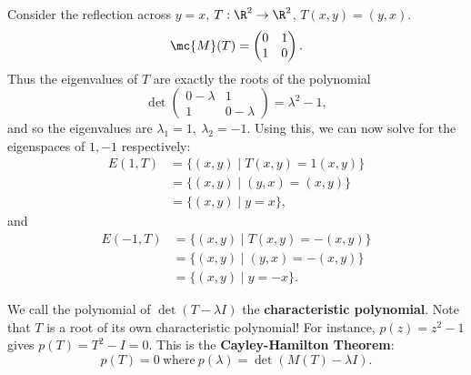 \documentclass[math0540-lecture-notes.tex]{subfiles}
\begin{document}
\begin{example}
  Consider the reflection across $y=x$, $T:\R^2\to \R^2$, $T(x,y)=(y,x)$. \[
    \mc{M}(T)=\begin{pmatrix} 0&1\\1&0 \end{pmatrix} 
  .\] Thus the eigenvalues of $T$ are exactly the roots of the polynomial \[
  \det{\begin{pmatrix} 0-\lambda&1\\1&0-\lambda \end{pmatrix} }=\lambda^2-1
  ,\] and so the eigenvalues are $\lambda_1=1,\ \lambda_2=-1$. Using this, we can now solve for the
  eigenspaces of $1,-1$ respectively:
  \begin{align*}
    E(1,T)&=\{(x,y)\mid T(x,y)=1(x,y)\} \\
          &=\{(x,y)\mid (y,x)=(x,y)\} \\
          &= \{(x,y)\mid y=x\} 
  ,\end{align*} and
  \begin{align*}
    E(-1,T)&=\{(x,y)\mid T(x,y)=-(x,y)\} \\
           &=\{(x,y)\mid (y,x)=-(x,y)\} \\
           &= \{(x,y)\mid y=-x\} 
  .\end{align*}
\end{example}

We call the polynomial of $\det{(T-\lambda I)}$ the \textbf{characteristic polynomial}. Note that
$T$ is a root of its own characteristic polynomial! For instance, $p(z)=z^2-1$ gives $p(T)=T^2-I=0$.
This is the \textbf{Cayley-Hamilton Theorem}: \[
  p(T)=0 ~\text{where}~p(\lambda)=\det{(M(T)-\lambda I)}
.\] 










 
\end{document}
